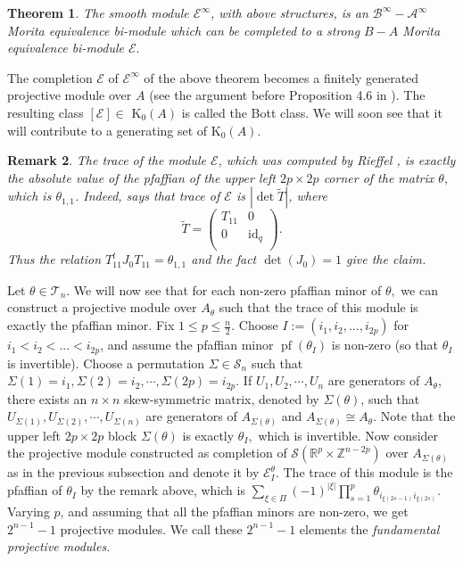 \documentclass[9pt, BCOR=2mm]{amsart}
\numberwithin{equation}{section}
\numberwithin{equation}{section}
\newtheorem{theorem}{Theorem}[section]
\newtheorem{remark}[theorem]{Remark}
\newcommand{\Z}{{\mathbb{Z}}}
\newcommand{\R}{{\mathbb{R}}}
\newcommand{\pf}{{\operatorname{pf}}}
\newcommand{\deta}{{\operatorname{det}}}
\newcommand{\K}{\mathrm{K}} %
\DeclareMathOperator{\id}{id}
\begin{document}
\begin{theorem}
  The smooth module $\mathcal{E}^{\infty}$, with above structures, is an $\mathcal{B}^{\infty}-\mathcal{A}^{\infty}$ Morita equivalence bi-module which can be completed to a strong $B-A$ Morita equivalence bi-module $\mathcal{E}.$
\end{theorem}

The completion $\mathcal{E}$ of $\mathcal{E}^{\infty}$ of the above theorem becomes a finitely generated projective module over $A$ (see the argument before Proposition 4.6 in \cite{ELPW10}). The resulting class $[\mathcal{E}] \in$ $\K_0(A)$ is called the Bott class. We will soon see that it will contribute to a generating set of $\K_0(A)$.
\begin{remark}\label{rmk:trace_of_heisenberg}
\normalfont
	The trace of the module $\mathcal{E}$, which was computed by Rieffel \cite{Rie88}, is exactly the absolute value of the pfaffian of the upper left $2p \times 2p$ corner of the matrix $\theta,$ which is $\theta_{1,1}$. Indeed, \cite[Proposition 4.3, page 289]{Rie88} says that trace of $\mathcal{E}$ is $|\deta \widetilde{T}|$, where 
$$
\widetilde{T}= \left( \begin{array}{cc}
T_{11} & 0\\
0  & \id_q\\
\end{array} \right).
$$ Thus the relation $T_{11}^tJ_0T_{11} = \theta_{1,1}$ and the fact $\deta (J_0) =1$ give the claim.
\end{remark}

Let $\theta \in \mathcal{T}_n.$ We will now see that for each non-zero pfaffian minor of $\theta,$ we can construct a projective module over $A_\theta$ such that the trace of this module is exactly the pfaffian minor.  Fix $1 \leq p \leq \frac{n}{2}$. Choose $I:=\left(i_{1}, i_{2}, \ldots, i_{2 p}\right)$ for $i_1 < i_2 < ... < i_{2p}$, and assume the pfaffian minor $\pf(\theta_I)$ is non-zero (so that $\theta_I$ is invertible). Choose a permutation $\Sigma \in \mathcal{S}_{n}$ such that $\Sigma(1) = i_1,  \Sigma(2) = i_2,\cdots, \Sigma(2p) = i_{2p}.$ If $U_1, U_2, \cdots, U_n$ are generators of $A_\theta$, there exists an $n \times n$ skew-symmetric matrix, denoted by  $\Sigma(\theta)$, such that $U_{\Sigma(1)},  U_{\Sigma(2)}, \cdots, U_{\Sigma(n)}$ are generators of $A_{\Sigma(\theta)}$ and $A_{\Sigma(\theta)} \cong A_\theta.$ Note that the upper left $2p \times 2p$ block $\Sigma(\theta)$ is exactly $\theta_{I},$ which is invertible. Now consider the projective module constructed as completion of $\mathscr{S}(\R^p \times \Z^{n-2p})$ over $A_{\Sigma(\theta)}$ as in the previous subsection and denote it by  $\mathcal{E}_{I}^{\theta}$. The trace of this module is the pfaffian of $\theta_{I}$ by the remark above, which is $\sum_{\xi \in \Pi}(-1)^{|\xi|}\prod^{p}_{s=1}\theta_{i_{\xi(2s-1)}i_{\xi(2s)}}.$  Varying $p$, and assuming that all the pfaffian minors are non-zero, we get $2^{n-1}-1$ projective modules. We call these $2^{n-1}-1$ elements the \emph{fundamental projective modules}. 
\end{document}
